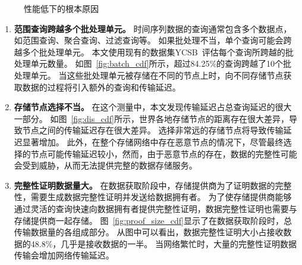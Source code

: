 \begin{figure*}[t]
    \centering
    \begin{minipage}{1\linewidth}
	    \centering
        \hfill
        \hfill
        \caption{性能低下的根本原因} 
    \end{minipage}
\end{figure*}

\begin{enumerate}
    \item \textbf{范围查询跨越多个批处理单元。}
    时间序列数据的查询通常包含多个数据点，如范围查询、聚合查询、过滤查询等。
    如果批处理不当，单个查询可能会跨越多个批处理单元。
    本文使用现有的数据集YCSB~\cite{barata2014ycsb}评估每个查询所跨越的批处理单元数量。
    如图~\autoref{fig:batch_cdf}所示，超过84.25\%的查询跨越了10个批处理单元。
    当这些批处理单元被存储在不同的节点上时，向不同存储节点获取数据的过程将引入额外的查询和传输延迟。

    \item \textbf{存储节点选择不当。}
    在这个测量中，本文发现传输延迟占总查询延迟的很大一部分。
    如图~\autoref{fig:dis_cdf}所示，世界各地存储节点的距离存在很大差异，导致节点之间的传输延迟存在很大差异。
    选择非常远的存储节点将导致传输延迟显著增加。
    此外，在整个存储网络中存在恶意节点的情况下，尽管最终选择的节点可能传输延迟较小，然而，由于恶意节点的存在，数据的完整性可能会受到威胁，从而无法提供完整的数据存储服务。

    \item \textbf{完整性证明数据量大。}
    在数据获取阶段中，存储提供商为了证明数据的完整性，需要生成数据完整性证明并发送给数据拥有者。
    为了使存储提供商能够通过灵活的查询快速向数据拥有者提供完整性证明，数据完整性证明也需要与存储提供商一起存储。
    图~\autoref{fig:proof_size_cdf}显示了在数据获取阶段时，总传输数据量的各组成部分。
    从图中可以看出，数据完整性证明大小占接收数据的48.8\%，几乎是接收数据的一半。
    当网络繁忙时，大量的完整性证明数据传输会增加网络传输延迟。
\end{enumerate}

